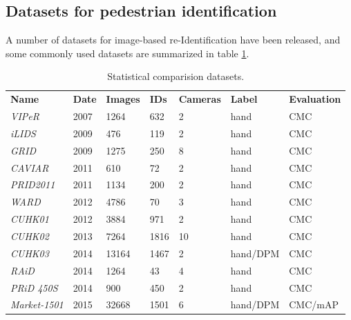 \documentclass[12pt, a4paper, titlepage,twoside,openright]{article}
\begin{document}
\subsection{Datasets for pedestrian identification}

A number of datasets for image-based re-Identification have been released, and some commonly used datasets are summarized in table \ref{tableID}. 


\begin{table}[H]
\centering

\begin{tabular}{lllllll}
\textbf{Name}        & \textbf{Date} & \textbf{Images} & \textbf{IDs} & \textbf{Cameras} & \textbf{Label} & \textbf{Evaluation} \\
\textit{VIPeR} \cite{viper}      & 2007          & 1264                      & 632          & 2                & hand           & CMC                 \\
\textit{iLIDS}  \cite{lids}      & 2009          & 476                       & 119          & 2                & hand           & CMC                 \\
\textit{GRID}   \cite{grid}     & 2009          & 1275                      & 250          & 8                & hand           & CMC                 \\
\textit{CAVIAR} \cite{caviar}      & 2011          & 610                       & 72           & 2                & hand           & CMC                 \\
\textit{PRID2011} \cite{prod11}   & 2011          & 1134                      & 200          & 2                & hand           & CMC                 \\
\textit{WARD}   \cite{ward}     & 2012          & 4786                      & 70           & 3                & hand           & CMC                 \\
\textit{CUHK01} \cite{cuk1}     & 2012          & 3884                      & 971          & 2                & hand           & CMC                 \\
\textit{CUHK02}  \cite{cuk2}    & 2013          & 7264                      & 1816         & 10               & hand           & CMC                 \\
\textit{CUHK03}  \cite{cuk3}    & 2014          & 13164                     & 1467         & 2                & hand/DPM       & CMC                 \\
\textit{RAiD}  \cite{raid}      & 2014          & 1264                      & 43           & 4                & hand           & CMC                 \\
\textit{PRiD 450S} \cite{prid450}   & 2014          & 900                       & 450          & 2                & hand           & CMC                 \\
\textit{Market-1501} \cite{market} & 2015          & 32668                     & 1501         & 6                & hand/DPM       & CMC/mAP            
\end{tabular}
\caption{Statistical comparision datasets.}
\label{tableID}
\end{table}
\end{document}

